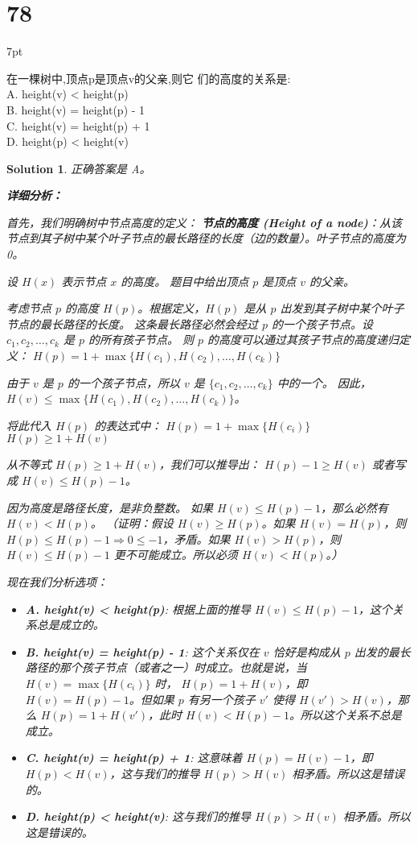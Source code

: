 \documentclass[UTF8]{report}
\newtheorem{solution}{Solution}
\theoremstyle{MyLineTheoremStyle} %
\theoremstyle{MyBlockTheoremStyle} %
\theoremstyle{MySubsubsectionStyle} %
\newenvironment{graybox}{%
        \def\FrameCommand{%
        \hspace{1pt}%
        {\color{gray}\small \vrule width 2pt}%
        {\color{graybox_color}\vrule width 4pt}%
        \colorbox{graybox_color}%
        }%
        \MakeFramed{\advance\hsize-\width\FrameRestore}%
        \noindent\hspace{-4.55pt}%
        \begin{adjustwidth}{}{7pt}%
        \vspace{2pt}\vspace{2pt}%
        }
        {%
        \vspace{2pt}\end{adjustwidth}\endMakeFramed%
        }
\begin{document}
\section*{78}
\begin{graybox}
在一棵树中,顶点p是顶点v的父亲,则它
们的高度的关系是: \\
A. height(v) < height(p) \\
B. height(v) = height(p) - 1 \\
C. height(v) = height(p) + 1 \\
D. height(p) < height(v)
\end{graybox}

\begin{solution}
正确答案是 A。

\textbf{详细分析：}

首先，我们明确树中节点高度的定义：
\textbf{节点的高度 (Height of a node)}：从该节点到其子树中某个叶子节点的最长路径的长度（边的数量）。叶子节点的高度为0。

设 $H(x)$ 表示节点 $x$ 的高度。
题目中给出顶点 $p$ 是顶点 $v$ 的父亲。

考虑节点 $p$ 的高度 $H(p)$。根据定义，$H(p)$ 是从 $p$ 出发到其子树中某个叶子节点的最长路径的长度。
这条最长路径必然会经过 $p$ 的一个孩子节点。设 $c_1, c_2, \ldots, c_k$ 是 $p$ 的所有孩子节点。
则 $p$ 的高度可以通过其孩子节点的高度递归定义：
$H(p) = 1 + \max \{ H(c_1), H(c_2), \ldots, H(c_k) \}$

由于 $v$ 是 $p$ 的一个孩子节点，所以 $v$ 是 $\{c_1, c_2, \ldots, c_k\}$ 中的一个。
因此，$H(v) \le \max \{ H(c_1), H(c_2), \ldots, H(c_k) \}$。

将此代入 $H(p)$ 的表达式中：
$H(p) = 1 + \max \{ H(c_i) \}$
$H(p) \ge 1 + H(v)$


从不等式 $H(p) \ge 1 + H(v)$，我们可以推导出：
$H(p) - 1 \ge H(v)$
或者写成 $H(v) \le H(p) - 1$。

因为高度是路径长度，是非负整数。
如果 $H(v) \le H(p) - 1$，那么必然有 $H(v) < H(p)$。
（证明：假设 $H(v) \ge H(p)$。如果 $H(v) = H(p)$，则 $H(p) \le H(p) - 1 \Rightarrow 0 \le -1$，矛盾。如果 $H(v) > H(p)$，则 $H(v) \le H(p) - 1$ 更不可能成立。所以必须 $H(v) < H(p)$。）

现在我们分析选项：
\begin{itemize}
    \item \textbf{A. height(v) < height(p)}: 根据上面的推导 $H(v) \le H(p) - 1$，这个关系总是成立的。
    \item \textbf{B. height(v) = height(p) - 1}: 这个关系仅在 $v$ 恰好是构成从 $p$ 出发的最长路径的那个孩子节点（或者之一）时成立。也就是说，当 $H(v) = \max \{ H(c_i) \}$ 时， $H(p) = 1 + H(v)$，即 $H(v) = H(p) - 1$。但如果 $p$ 有另一个孩子 $v'$ 使得 $H(v') > H(v)$，那么 $H(p) = 1 + H(v')$，此时 $H(v) < H(p) - 1$。所以这个关系不总是成立。
    \item \textbf{C. height(v) = height(p) + 1}: 这意味着 $H(p) = H(v) - 1$，即 $H(p) < H(v)$，这与我们的推导 $H(p) > H(v)$ 相矛盾。所以这是错误的。
    \item \textbf{D. height(p) < height(v)}: 这与我们的推导 $H(p) > H(v)$ 相矛盾。所以这是错误的。
\end{itemize}


\end{solution}
\end{document}
